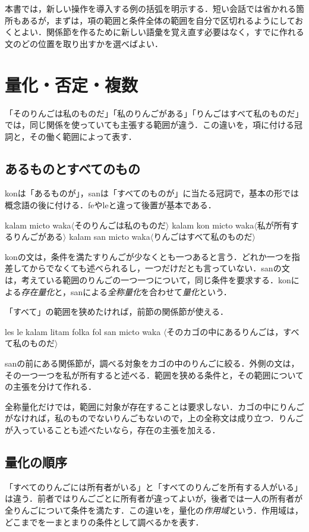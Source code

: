 \documentclass[b5paper, 10pt]{ltjsarticle}
\newcommand{\ko}[1]{\textsf{#1}}
\newcommand{\sentence}[1]{$\langle$#1$\rangle$}
\begin{document}
本書では，新しい操作を導入する例の括弧を明示する．短い会話では省かれる箇所もあるが，まずは，項の範囲と条件全体の範囲を自分で区切れるようにしておくとよい．関係節を作るために新しい語彙を覚え直す必要はなく，すでに作れる文のどの位置を取り出すかを選べばよい．

\section{量化・否定・複数}
「そのりんごは私のものだ」「私のりんごがある」「りんごはすべて私のものだ」では，同じ関係を使っていても主張する範囲が違う．この違いを，項に付ける冠詞と，その働く範囲によって表す．

\subsection{あるものとすべてのもの}
\ko{kon}は「あるものが」，\ko{san}は「すべてのものが」に当たる冠詞で，基本の形では概念語の後に付ける．\ko{fe}や\ko{le}と違って後置が基本である．
\begin{exe}
    \ex \ko{kalam micto waka}\hfill \sentence{そのりんごは私のものだ}
    \ex \ko{kalam kon micto waka}\hfill \sentence{私が所有するりんごがある}
    \ex \ko{kalam san micto waka}\hfill \sentence{りんごはすべて私のものだ}
\end{exe}
\ko{kon}の文は，条件を満たすりんごが少なくとも一つあると言う．どれか一つを指差してからでなくても述べられるし，一つだけだとも言っていない．\ko{san}の文は，考えている範囲のりんごの一つ一つについて，同じ条件を要求する．\ko{kon}による\emph{存在量化}と，\ko{san}による\emph{全称量化}を合わせて\emph{量化}という．

「すべて」の範囲を狭めたければ，前節の関係節が使える．
\begin{exe}
    \ex \ko{les le kalam litam folka fol san micto waka}
    \glt \sentence{そのカゴの中にあるりんごは，すべて私のものだ}
\end{exe}
\ko{san}の前にある関係節が，調べる対象をカゴの中のりんごに絞る．外側の文は，その一つ一つを私が所有すると述べる．範囲を狭める条件と，その範囲についての主張を分けて作れる．

\begin{remark}
    全称量化だけでは，範囲に対象が存在することは要求しない．カゴの中にりんごがなければ，私のものでないりんごもないので，上の全称文は成り立つ．りんごが入っていることも述べたいなら，存在の主張を加える．
\end{remark}

\subsection{量化の順序}
「すべてのりんごには所有者がいる」と「すべてのりんごを所有する人がいる」は違う．前者ではりんごごとに所有者が違ってよいが，後者では一人の所有者が全りんごについて条件を満たす．この違いを，量化の\emph{作用域}という．作用域は，どこまでを一まとまりの条件として調べるかを表す．
\end{document}
